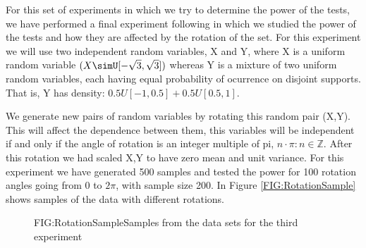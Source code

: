 For this set of experiments in which we try to determine the power of the tests, we have performed a final experiment following \cite{Size} in which we studied the power of the tests and how they are affected by the rotation of the set.
For this experiment we will use two independent random variables, X and Y, where X is a uniform random variable $(X\simU[-\sqrt{3},\sqrt{3}])$ whereas Y is a mixture of two uniform random variables, each having equal probability of ocurrence on disjoint supports. That is, Y has density: $0.5U[-1,0.5] + 0.5U[0.5,1]$.

We generate new pairs of random variables by rotating this random pair (X,Y). This will affect the dependence between them, this variables will be independent if and only if the angle of rotation is an integer multiple of pi, $n\cdot\pi : n\in\mathbb{Z}$. After this rotation we had scaled X,Y to have zero mean and unit variance.
For this experiment we have generated 500 samples and tested the power for 100 rotation angles going from 0 to $2\pi$, with sample size 200. In Figure \ref{FIG:RotationSample} shows samples of the data with different rotations.


\begin{figure}[Experiment 3 rotation pattern sample]{FIG:RotationSample}{Samples from the data sets for the third experiment}
\end{figure}
